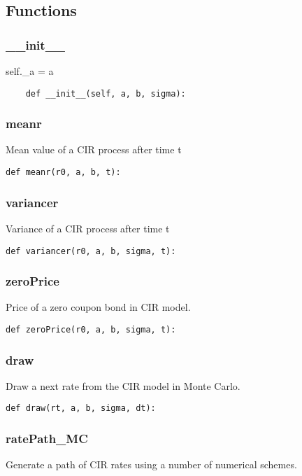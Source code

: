 \documentclass[twoside,11pt]{book}
\begin{document}
\subsection*{Functions}

\subsubsection*{{\bf \_\_init\_\_}}
self.\_a = a 

\begin{lstlisting}
    def __init__(self, a, b, sigma):
\end{lstlisting}

\subsubsection*{{\bf meanr}}
Mean value of a CIR process after time t  

\begin{lstlisting}
def meanr(r0, a, b, t):
\end{lstlisting}

\subsubsection*{{\bf variancer}}
Variance of a CIR process after time t  

\begin{lstlisting}
def variancer(r0, a, b, sigma, t):
\end{lstlisting}

\subsubsection*{{\bf zeroPrice}}
Price of a zero coupon bond in CIR model.  

\begin{lstlisting}
def zeroPrice(r0, a, b, sigma, t):
\end{lstlisting}

\subsubsection*{{\bf draw}}
Draw a next rate from the CIR model in Monte Carlo.  

\begin{lstlisting}
def draw(rt, a, b, sigma, dt):
\end{lstlisting}

\subsubsection*{{\bf ratePath\_MC}}
Generate a path of CIR rates using a number of numerical schemes.  
\end{document}
